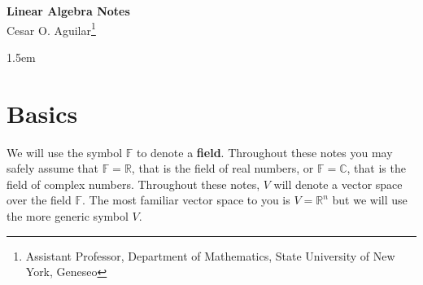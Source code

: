 \documentclass[12pt]{article}
\newcommand{\real}{\mathbb{R}}
\theoremstyle{definition}
\begin{document}
\begin{center}
\textbf{\Large Linear Algebra Notes}\\[0.5cm]
Cesar O. Aguilar\footnote{Assistant Professor, Department of Mathematics, State University of New York, Geneseo}
\end{center}

\tableofcontents
\baselineskip 1.5em


\section{Basics}
We will use the symbol $\mathbb{F}$ to denote a \textbf{field}.  Throughout these notes you may safely assume that $\mathbb{F}=\real$, that is the field of real numbers, or $\mathbb{F}=\mathbb{C}$, that is the field of complex numbers.  Throughout these notes, $V$ will denote a vector space over the field $\mathbb{F}$.  The most familiar vector space to you is $V=\real^n$ but we will use the more generic symbol $V$.
\end{document}
